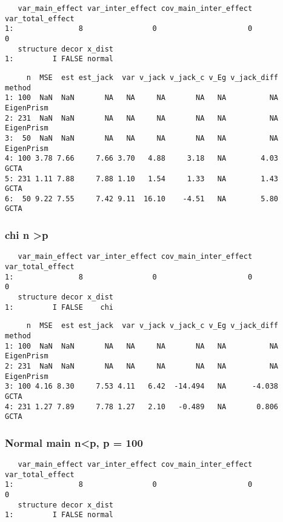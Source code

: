 \documentclass[]{article}
\begin{document}
\begin{verbatim}
   var_main_effect var_inter_effect cov_main_inter_effect var_total_effect
1:               8                0                     0                0
   structure decor x_dist
1:         I FALSE normal
\end{verbatim}

\begin{verbatim}
     n  MSE  est est_jack  var v_jack v_jack_c v_Eg v_jack_diff     method
1: 100  NaN  NaN       NA   NA     NA       NA   NA          NA EigenPrism
2: 231  NaN  NaN       NA   NA     NA       NA   NA          NA EigenPrism
3:  50  NaN  NaN       NA   NA     NA       NA   NA          NA EigenPrism
4: 100 3.78 7.66     7.66 3.70   4.88     3.18   NA        4.03       GCTA
5: 231 1.11 7.88     7.88 1.10   1.54     1.33   NA        1.43       GCTA
6:  50 9.22 7.55     7.42 9.11  16.10    -4.51   NA        5.80       GCTA
\end{verbatim}

\subsubsection{chi n \textgreater{}p}\label{chi-n-p}

\begin{verbatim}
   var_main_effect var_inter_effect cov_main_inter_effect var_total_effect
1:               8                0                     0                0
   structure decor x_dist
1:         I FALSE    chi
\end{verbatim}

\begin{verbatim}
     n  MSE  est est_jack  var v_jack v_jack_c v_Eg v_jack_diff     method
1: 100  NaN  NaN       NA   NA     NA       NA   NA          NA EigenPrism
2: 231  NaN  NaN       NA   NA     NA       NA   NA          NA EigenPrism
3: 100 4.16 8.30     7.53 4.11   6.42  -14.494   NA      -4.038       GCTA
4: 231 1.27 7.89     7.78 1.27   2.10   -0.489   NA       0.806       GCTA
\end{verbatim}

\subsubsection{Normal main n\textless{}p, p =
100}\label{normal-main-np-p-100}

\begin{verbatim}
   var_main_effect var_inter_effect cov_main_inter_effect var_total_effect
1:               8                0                     0                0
   structure decor x_dist
1:         I FALSE normal
\end{verbatim}
\end{document}
